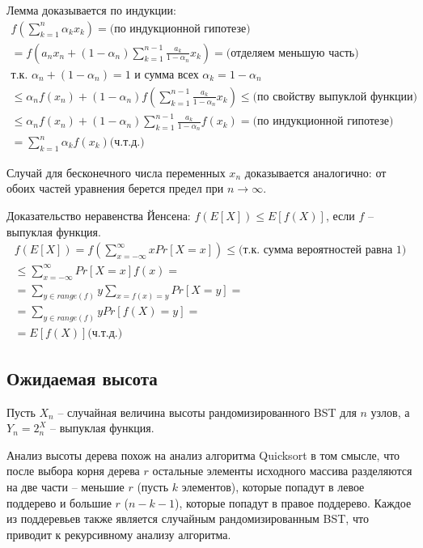 Лемма доказывается по индукции:
\begin{align*}
  f(\sum_{k=1}^{n} \alpha_k x_k) = \text{(по индукционной гипотезе)} \\ 
  = f(a_n x_n + (1-\alpha_n) \sum_{k=1}^{n-1} \frac{a_k}{1-\alpha_n} x_k) = \text{(отделяем меньшую часть)} \\
  \text{т.к. } \alpha_n + (1-\alpha_n) = 1 \text{ и сумма всех } \alpha_k = 1 - \alpha_n \\
  \leqslant \alpha_n f(x_n) + (1-\alpha_n)f(\sum_{k=1}^{n-1} \frac{a_k}{1-\alpha_n} x_k) \leqslant \text{(по свойству выпуклой функции)} \\
  \leqslant \alpha_n f(x_n) + (1-\alpha_n)\sum_{k=1}^{n-1} \frac{a_k}{1-\alpha_n} f(x_k) = \text{(по индукционной гипотезе)} \\
  = \sum_{k=1}^{n} \alpha_k f(x_k) \text{(ч.т.д.)}
\end{align*}

Случай для бесконечного числа переменных $x_n$ доказывается аналогично: от обоих частей уравнения берется предел при $n \to \infty$.

Доказательство неравенства Йенсена: $f(E[X]) \leqslant E[f(X)]$, если $f$ -- выпуклая функция.
\begin{align*}
  f(E[X]) = f(\sum_{x = - \infty}^{\infty} x Pr[X = x]) \leqslant \text{(т.к. сумма вероятностей равна 1)} \\
  \leqslant \sum_{x= - \infty}^{\infty} Pr[X = x] f(x) = \\ 
  = \sum_{y \in range(f)} y \sum_{x = f(x) = y} Pr[X = y] = \\
  = \sum_{y \in range(f)} y Pr[f(X) = y] = \\
  = E[f(X)] \text{(ч.т.д.)}
\end{align*}

\subsection{Ожидаемая высота}

Пусть $X_n$ -- случайная величина высоты рандомизированного BST для $n$ узлов, а $Y_n = 2^X_n$ -- выпуклая функция.

Анализ высоты дерева похож на анализ алгоритма Quicksort в том смысле, что после выбора корня дерева $r$ остальные элементы исходного массива разделяются на две части -- меньшие $r$ (пусть $k$ элементов), которые попадут в левое поддерево и большие $r$ ($n - k - 1$), которые попадут в правое поддерево. Каждое из поддеревьев также является случайным рандомизированным BST, что приводит к рекурсивному анализу алгоритма.

